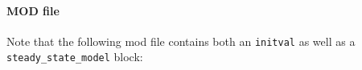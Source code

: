 \paragraph{MOD file} Note that the following mod file contains both an \texttt{initval} as well as a \texttt{steady\_state\_model} block:

